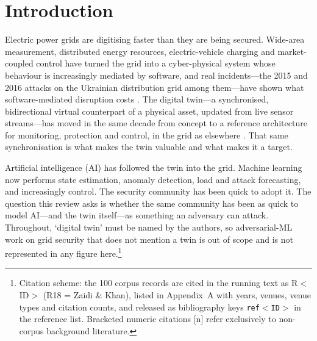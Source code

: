 \documentclass[preprint,12pt]{elsarticle}
\renewcommand{\_}{\plainunderscore\allowbreak}
\begin{document}
\linenumbers

\section{Introduction}

Electric power grids are digitising faster than they are being secured. Wide-area measurement,
distributed energy resources, electric-vehicle charging and market-coupled control have turned
the grid into a cyber-physical system whose behaviour is increasingly mediated by software, and
real incidents---the 2015 and 2016 attacks on the Ukrainian distribution grid among
them---have shown what software-mediated disruption costs \cite{eisac2016,liang2017}. The
digital twin---a synchronised, bidirectional virtual counterpart of a physical asset, updated
from live sensor streams---has moved in the same decade from concept to a reference
architecture for monitoring, protection and control, in the grid as elsewhere
\cite{glaessgen2012,grieves2014,tao2019}. That
same synchronisation is what makes the twin valuable and what makes it a target.

Artificial intelligence (AI) has followed the twin into the grid. Machine learning now performs
state estimation, anomaly detection, load and attack forecasting, and increasingly control.
The security community has been quick to adopt it. The question this review
asks is whether the same community has been as quick to model AI---and the twin itself---as
something an adversary can attack. Throughout, `digital twin' must be named by the authors, so
adversarial-ML work on grid security that does not mention a twin is out of scope and is not
represented in any figure here.\footnote{Citation scheme: the 100 corpus records are cited
in the running text as R$<$ID$>$ (R18 = Zaidi \& Khan), listed in Appendix~A with years,
venues, venue types and citation counts, and released as bibliography keys
\texttt{ref$<$ID$>$} in the reference list. Bracketed numeric citations [n] refer
exclusively to non-corpus background literature.}
\end{document}
